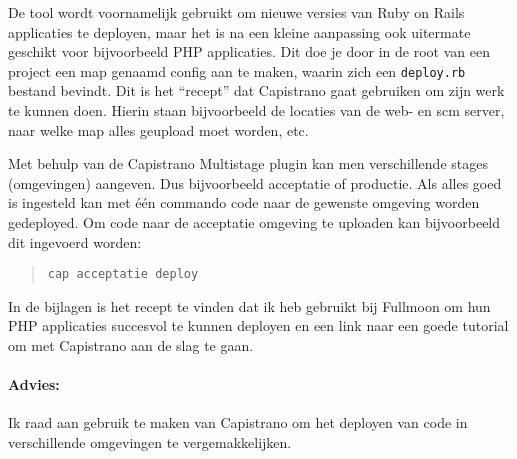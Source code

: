 De tool wordt voornamelijk gebruikt om nieuwe versies van Ruby on Rails applicaties te deployen, maar het is na een kleine aanpassing ook uitermate geschikt voor bijvoorbeeld PHP applicaties. Dit doe je door in de root van een project een map genaamd config aan te maken, waarin zich een \texttt{deploy.rb} bestand bevindt. Dit is het ``recept'' dat Capistrano gaat gebruiken om zijn werk te kunnen doen. Hierin staan bijvoorbeeld de locaties van de web- en {\sc scm} server, naar welke map alles geupload moet worden, etc.

Met behulp van de Capistrano Multistage plugin\cite{capistranomultistage} kan men verschillende stages (omgevingen) aangeven. Dus bijvoorbeeld acceptatie of productie. Als alles goed is ingesteld kan met één commando code naar de gewenste omgeving worden gedeployed. Om code naar de acceptatie omgeving te uploaden kan bijvoorbeeld dit ingevoerd worden:

\begin{quote}
  \texttt{cap acceptatie deploy}
\end{quote}

In de bijlagen is het recept te vinden dat ik heb gebruikt bij Fullmoon om hun PHP applicaties succesvol te kunnen deployen en een link naar een goede tutorial om met Capistrano aan de slag te gaan.

\paragraph{Advies:} Ik raad aan gebruik te maken van Capistrano om het deployen van code in verschillende omgevingen te vergemakkelijken.

